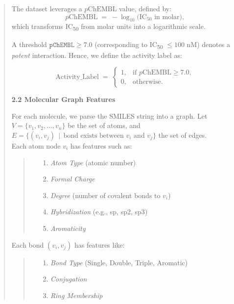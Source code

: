 \documentclass[fontsize=11pt]{article}
\begin{document}
\begin{itemize}
\begin{quote}
    \quad The dataset leverages a $p\text{ChEMBL}$ value, defined by:
    \[
        p\text{ChEMBL} \;=\; -\log_{10}\bigl(\text{IC}_{50} \text{ in molar}\bigr),
    \]
    which transforms IC\textsubscript{50} from molar units into a logarithmic scale. 
    
    A threshold $\texttt{pChEMBL} \ge 7.0$ (corresponding to IC\textsubscript{50} $\leq 100\text{ nM}$) 
    denotes a \emph{potent} interaction. Hence, we define the activity label as:
    
    \[
        \text{Activity\_Label} \;=\; 
        \begin{cases}
        1, & \text{if } p\text{ChEMBL} \ge 7.0,\\
        0, & \text{otherwise}.
        \end{cases}
    \]
    
    \textbf{2.2 Molecular Graph Features}
    
    \quad For each molecule, we parse the SMILES string into a graph. Let $V = \{v_1, v_2, \dots, v_n\}$ 
    be the set of atoms, and $E = \{(v_i, v_j)\,\mid\, \text{bond exists between $v_i$ and $v_j$}\}$ the set of edges. \\
    
    Each atom node $v_i$ has features such as:
    \begin{quote}
        \begin{itemize}
            \item[1.] \emph{Atom Type} (atomic number)
            \item[2.] \emph{Formal Charge}
            \item[3.] \emph{Degree} (number of covalent bonds to $v_i$)
            \item[4.] \emph{Hybridization} (e.g., sp, sp2, sp3)
            \item[5.] \emph{Aromaticity}
        \end{itemize}
    \end{quote}
    Each bond $(v_i, v_j)$ has features like:
    \begin{quote}
        \begin{itemize}
            \item[1.] \emph{Bond Type} (Single, Double, Triple, Aromatic)
            \item[2.] \emph{Conjugation}
            \item[3.] \emph{Ring Membership}
        \end{itemize}
    \end{quote}


\end{quote}
\end{itemize}
\end{document}
